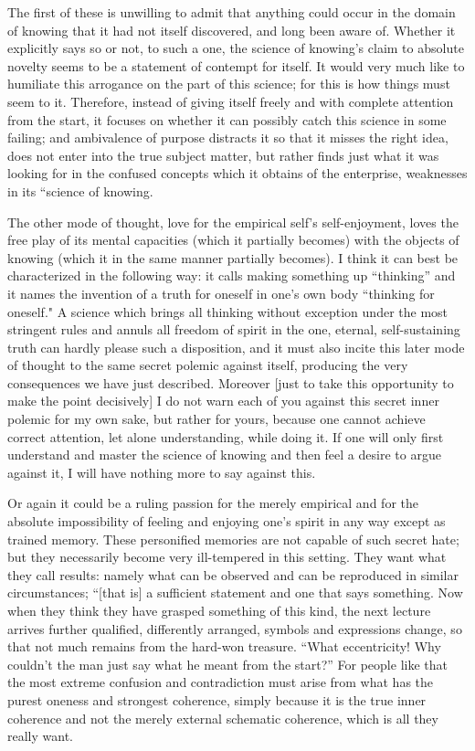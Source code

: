 The first of these is unwilling to admit
that anything could occur in the domain of knowing
that it had not itself discovered,
and long been aware of.
Whether it explicitly says so or not, to such a one,
the science of knowing’s claim to absolute novelty
seems to be a statement of contempt for itself.
It would very much like to humiliate
this arrogance on the part of this science;
for this is how things must seem to it.
Therefore, instead of giving itself freely
and with complete attention from the start,
it focuses on whether it can possibly catch
this science in some failing;
and ambivalence of purpose distracts it
so that it misses the right idea,
does not enter into the true subject matter,
but rather finds just what it was looking for
in the confused concepts
which it obtains of the enterprise,
weaknesses in its “science of knowing.

The other mode of thought,
love for the empirical self’s self-enjoyment,
loves the free play of its mental capacities
(which it partially becomes)
with the objects of knowing
(which it in the same manner partially becomes).
I think it can best be characterized in the following way:
it calls making something up “thinking”
and it names the invention of a truth
for oneself in one’s own body
“thinking for oneself."
A science which brings all
thinking without exception
under the most stringent rules
and annuls all freedom of spirit
in the one, eternal, self-sustaining truth
can hardly please such a disposition,
and it must also incite this later
mode of thought to the same
secret polemic against itself,
producing the very consequences we have just described.
Moreover [just to take this opportunity
to make the point decisively]
I do not warn each of you against
this secret inner polemic for my own sake,
but rather for yours,
because one cannot achieve correct attention,
let alone understanding,
while doing it.
If one will only first understand
and master the science of knowing
and then feel a desire to argue against it,
I will have nothing more to say against this.

Or again it could be a ruling passion
for the merely empirical
and for the absolute impossibility of
feeling and enjoying one’s spirit in any way
except as trained memory.
These personified memories are not capable of such secret hate;
but they necessarily become very ill-tempered in this setting.
They want what they call results:
namely what can be observed and
can be reproduced in similar circumstances;
“[that is] a sufficient statement and one that says something.
Now when they think they have grasped something of this kind,
the next lecture arrives further qualified,
differently arranged, symbols and expressions change,
so that not much remains from the hard-won treasure.
“What eccentricity! Why couldn’t the man
just say what he meant from the start?”
For people like that the most extreme confusion and contradiction
must arise from what has the purest oneness and strongest coherence,
simply because it is the true inner coherence
and not the merely external schematic coherence,
which is all they really want.

